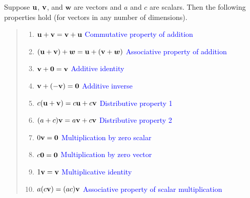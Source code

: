 \documentclass[../mathNotesPreamble]{subfiles}
\begin{document}
  \begin{thmBox*}
    Suppose ${\mathbf{u}}$, ${\mathbf{v}}$, and $\bm{w}$ are vectors and $a$ and $c$ are scalars. Then the following properties hold (for vectors in any number of dimensions).
    \begin{quote}
      \begin{enumerate}
        \item 
          ${\mathbf{u}}+{\mathbf{v}}={\mathbf{v}}+{\mathbf{u}}$
          \tab \textcolor{blue}{Commutative property of addition}
        \item 
          ${\left({\mathbf{u}}+{\mathbf{v}}\right)}+\bm w={\mathbf{u}}+{\left({\mathbf{v}}+\bm w\right)}$
          \tab \textcolor{blue}{Associative property of addition}
        \item 
          ${\mathbf{v}}+\mathbf{0}={\mathbf{v}}$
          \tab \textcolor{blue}{Additive identity}
        \item 
          ${\mathbf{v}}+{\left(-{\mathbf{v}}\right)}=\mathbf{0}$
          \tab \textcolor{blue}{Additive inverse}
        \item 
          $c{\left({\mathbf{u}}+{\mathbf{v}}\right)}=c{\mathbf{u}}+c{\mathbf{v}}$
          \tab \textcolor{blue}{Distributive property 1}
        \item 
          ${\left(a+c\right)}{\mathbf{v}}=a{\mathbf{v}}+c{\mathbf{v}}$
          \tab \textcolor{blue}{Distributive property 2}
        \item 
          $0{\mathbf{v}}=\mathbf{0}$
          \tab \textcolor{blue}{Multiplication by zero scalar}
        \item 
          $c\mathbf{0}=\mathbf{0}$
          \tab \textcolor{blue}{Multiplication by zero vector}
        \item 
          $1{\mathbf{v}}={\mathbf{v}}$
          \tab \textcolor{blue}{Multiplicative identity}
        \item 
          $a{\left(c{\mathbf{v}}\right)}={\left(ac\right)}{\mathbf{v}}$ 
          \tab \textcolor{blue}{Associative property of scalar multiplication}
      \end{enumerate}
    \end{quote}
  \end{thmBox*}

  \pagebreak
\end{document}
